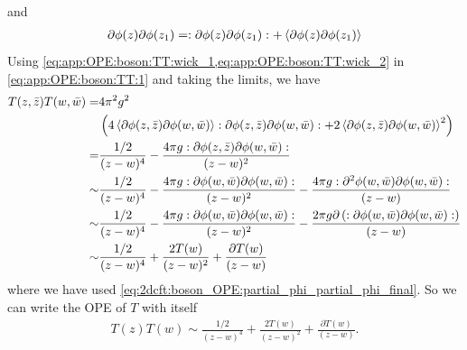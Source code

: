 \documentclass[10pt]{article}
\begin{document}
and
\begin{align}
    \partial\phi(z)\partial\phi(z_1)=:\partial\phi(z)\partial\phi(z_1):+\expval{\partial\phi(z)\partial\phi(z_1)}\label{eq:app:OPE:boson:TT:wick_2}
\end{align}
Using \cref{eq:app:OPE:boson:TT:wick_1,eq:app:OPE:boson:TT:wick_2} in \cref{eq:app:OPE:boson:TT:1} and taking the limits, we have
\begin{align}
    T(z,\bar{z})T(w,\bar{w})= & 4\pi^2 g^2\notag\\
                              &\left(4\expval{\partial\phi(z,\bar{z})\partial\phi(w,\bar{w})}:\partial\phi(z,\bar{z})\partial\phi(w,\bar{w}):+2\expval{\partial\phi(z,\bar{z})\partial\phi(w,\bar{w})}^2\right)\notag   \\
    =                         & \frac{1/2}{(z-w)^4}-\frac{4\pi g:\partial\phi(z,\bar{z})\partial\phi(w,\bar{w}):}{(z-w)^2}\notag                                                                                           \\
    \sim                      & \frac{1/2}{(z-w)^4}-\frac{4\pi g:\partial\phi(w,\bar{w})\partial\phi(w,\bar{w}):}{(z-w)^2}-\frac{4\pi g:\partial^2\phi(w,\bar{w})\partial\phi(w,\bar{w}):}{(z-w)}\notag                    \\
    \sim                      & \frac{1/2}{(z-w)^4}-\frac{4\pi g:\partial\phi(w,\bar{w})\partial\phi(w,\bar{w}):}{(z-w)^2}-\frac{2\pi g\partial\left(:\partial\phi(w,\bar{w})\partial\phi(w,\bar{w}):\right)}{(z-w)}\notag \\
    \sim                      & \frac{1/2}{(z-w)^4}+\frac{2T(w)}{(z-w)^2}+\frac{\partial T(w)}{(z-w)}
\end{align}
where we have used \cref{eq:2dcft:boson_OPE:partial_phi_partial_phi_final}.
So we can write the OPE of $T$ with itself
\begin{align}
    T(z)T(w)\sim\frac{1/2}{(z-w)^4}+\frac{2T(w)}{(z-w)^2}+\frac{\partial T(w)}{(z-w)}.
\end{align}

\clearpage


\end{document}
